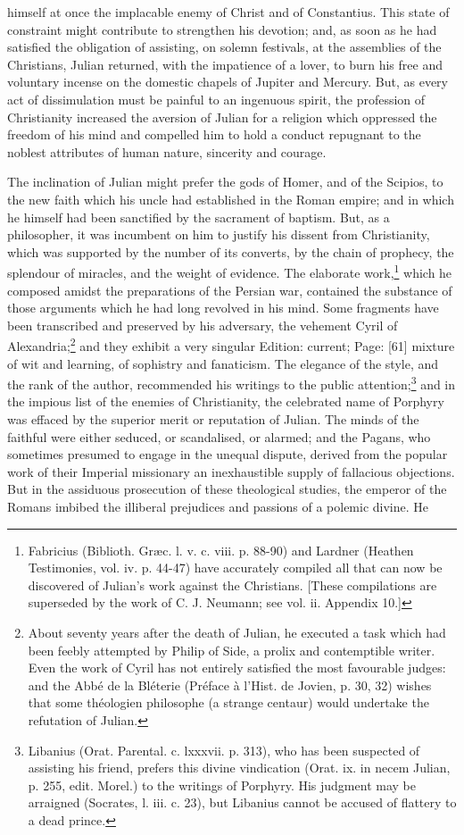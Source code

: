 himself at once the implacable enemy of Christ and of Constantius. This state of constraint might contribute to strengthen his devotion; and, as soon as he had satisfied the obligation of assisting, on solemn festivals, at the assemblies of the Christians, Julian returned, with the impatience of a lover, to burn his free and voluntary incense on the domestic chapels of Jupiter and Mercury. But, as every act of dissimulation must be painful to an ingenuous spirit, the profession of Christianity increased the aversion of Julian for a religion which oppressed the freedom of his mind and compelled him to hold a conduct repugnant to the noblest attributes of human nature, sincerity and courage.

The inclination of Julian might prefer the gods of Homer, and of the Scipios, to the new faith which his uncle had established in the Roman empire; and in which he himself had been sanctified by the sacrament of baptism. But, as a philosopher, it was incumbent on him to justify his dissent from Christianity, which was supported by the number of its converts, by the chain of prophecy, the splendour of miracles, and the weight of evidence. The elaborate work,\footnote{Fabricius (Biblioth. Græc. l. v. c. viii. p. 88-90) and Lardner (Heathen Testimonies, vol. iv. p. 44-47) have accurately compiled all that can now be discovered of Julian\texthebrew{}’s work against the Christians. [These compilations are superseded by the work of C. J. Neumann; see vol. ii. Appendix 10.]} which he composed amidst the preparations of the Persian war, contained the substance of those arguments which he had long revolved in his mind. Some fragments have been transcribed and preserved by his adversary, the vehement Cyril of Alexandria;\footnote{About seventy years after the death of Julian, he executed a task which had been feebly attempted by Philip of Side, a prolix and contemptible writer. Even the work of Cyril has not entirely satisfied the most favourable judges: and the Abbé de la Bléterie (Préface à l\texthebrew{}’Hist. de Jovien, p. 30, 32) wishes that some théologien philosophe (a strange centaur) would undertake the refutation of Julian.} and they exhibit a very singular Edition: current; Page: [61] mixture of wit and learning, of sophistry and fanaticism. The elegance of the style, and the rank of the author, recommended his writings to the public attention;\footnote{Libanius (Orat. Parental. c. lxxxvii. p. 313), who has been suspected of assisting his friend, prefers this divine vindication (Orat. ix. in necem Julian, p. 255, edit. Morel.) to the writings of Porphyry. His judgment may be arraigned (Socrates, l. iii. c. 23), but Libanius cannot be accused of flattery to a dead prince.} and in the impious list of the enemies of Christianity, the celebrated name of Porphyry was effaced by the superior merit or reputation of Julian. The minds of the faithful were either seduced, or scandalised, or alarmed; and the Pagans, who sometimes presumed to engage in the unequal dispute, derived from the popular work of their Imperial missionary an inexhaustible supply of fallacious objections. But in the assiduous prosecution of these theological studies, the emperor of the Romans imbibed the illiberal prejudices and passions of a polemic divine. He 
